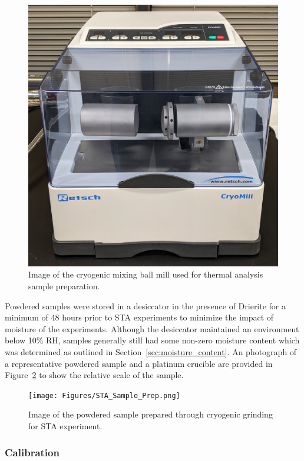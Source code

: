\documentclass[12pt,oneside]{book}
\begin{document}
\begin{figure}[!ht]
\centering
\includegraphics[width=.75\columnwidth]{Figures/Cryomill.png}
\caption[Image of the Cryogenic Mixing Ball Mill Used for Thermal Analysis Sample Preparation]{Image of the cryogenic mixing ball mill used for thermal analysis sample preparation.}
\label{fig:cryomill}
\end{figure}

Powdered samples were stored in a desiccator in the presence of Drierite for a minimum of 48 hours prior to STA experiments to minimize the impact of moisture of the experiments. Although the desiccator maintained an environment below 10\% RH, samples generally still had some non-zero moisture content which was determined as outlined in Section~\ref{sec:moisture_content}. An photograph of a representative powdered sample and a platinum crucible are provided in Figure~\ref{fig:sta_sample} to show the relative scale of the sample.

\begin{figure}[!ht]
\centering
\texttt{[image: Figures/STA\_Sample\_Prep.png]}
\caption[Image of the Powdered Sample Prepared through Cryogenic Grinding for STA Experiment]{Image of the powdered sample prepared through cryogenic grinding for STA experiment.}
\label{fig:sta_sample}
\end{figure}

\subsubsection{Calibration}
\end{document}
